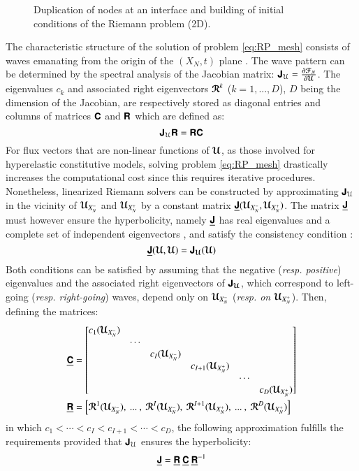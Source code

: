  
\begin{figure}[ht]
  \centering
  
  \caption{Duplication of nodes at an interface and building of initial conditions of the Riemann problem (2D).}
  \label{fig:2D_edge}
\end{figure}
The characteristic structure of the solution of problem \eqref{eq:RP_mesh} consists of waves emanating from the origin of the $(X_N,t)$ plane \cite{Courant}.
The wave pattern can be determined by the spectral analysis of the Jacobian matrix: $\boldsymbol{\mathsf{J}}_{\mathcal{U}} = \frac{\partial {\boldsymbol{\mathcal{F}}}_N}{\partial {\boldsymbol{\mathcal{U}}}}$.
The eigenvalues $c_k$ and associated right eigenvectors ${\boldsymbol{\mathcal{R}}}^k$ ($k=1, ..., D$), $D$ being the dimension of the Jacobian, are respectively stored as diagonal entries and columns of matrices $\boldsymbol{\mathsf{C}}$ and $\boldsymbol{\mathsf{R}}$ which are defined as:
\begin{equation}
  \label{eq:eigen_matrices}
  \boldsymbol{\mathsf{J}}_{\mathcal{U}} \boldsymbol{\mathsf{R}} = \boldsymbol{\mathsf{R}} \boldsymbol{\mathsf{C}}
\end{equation}
For flux vectors that are non-linear functions of ${\boldsymbol{\mathcal{U}}}$, as those involved for hyperelastic constitutive models, solving problem \eqref{eq:RP_mesh} drastically increases the computational cost since this requires iterative procedures.
Nonetheless, linearized Riemann solvers \cite{Toro} can be constructed by approximating $\boldsymbol{\mathsf{J}}_{\mathcal{U}}$ in the vicinity of ${\boldsymbol{\mathcal{U}}}_{X_N^-}$ and ${\boldsymbol{\mathcal{U}}}_{X_N^+}$ by a constant matrix $\underline{\boldsymbol{\mathsf{J}}}({\boldsymbol{\mathcal{U}}}_{X_N^-},{\boldsymbol{\mathcal{U}}}_{X_N^+})$.
The matrix $\underline{\boldsymbol{\mathsf{J}}}$ must however ensure the hyperbolicity, namely $\underline{\boldsymbol{\mathsf{J}}}$ has real eigenvalues and a complete set of independent eigenvectors \cite{Courant}, and satisfy the consistency condition \cite{Leveque}:
\begin{equation}
  \label{eq:consistency_Jacobian}
  \underline{\boldsymbol{\mathsf{J}}}({\boldsymbol{\mathcal{U}}},{\boldsymbol{\mathcal{U}}}) = \boldsymbol{\mathsf{J}}_{\boldsymbol{\mathcal{U}}}({\boldsymbol{\mathcal{U}}}) 
\end{equation}
Both conditions can be satisfied by assuming that the negative (\textit{resp. positive}) eigenvalues and the associated right eigenvectors of $\boldsymbol{\mathsf{J}}_{\boldsymbol{\mathcal{U}}}$, which correspond to left-going (\textit{resp. right-going}) waves, depend only on  ${\boldsymbol{\mathcal{U}}}_{X_N^-}$ (\textit{resp. on ${\boldsymbol{\mathcal{U}}}_{X_N^+}$}).
Then, defining the matrices:
\begin{align*}
  &\underline{\boldsymbol{\mathsf{C}}}=\left[\begin{matrix}c_1({\boldsymbol{\mathcal{U}}}_{X_N^-}) & & & & & \\ & \cdots & & && \\ & &c_I({\boldsymbol{\mathcal{U}}}_{X_N^-}) & & &\\ & & &c_{I+1}({\boldsymbol{\mathcal{U}}}_{X_N^+})& & \\ & & & &\cdots &\\ &&&&&c_D({\boldsymbol{\mathcal{U}}}_{X_N^+})\end{matrix}\right] \\
  &\underline{\boldsymbol{\mathsf{R}}} = \left[\begin{matrix}{\boldsymbol{\mathcal{R}}}^1({\boldsymbol{\mathcal{U}}}_{X_N^-}),\:  ...\:  ,\: {\boldsymbol{\mathcal{R}}}^I({\boldsymbol{\mathcal{U}}}_{X_N^-}),\: {\boldsymbol{\mathcal{R}}}^{I+1}({\boldsymbol{\mathcal{U}}}_{X_N^+}),\:...\: ,\: {\boldsymbol{\mathcal{R}}}^D({\boldsymbol{\mathcal{U}}}_{X_N^+})\end{matrix}\right] 
\end{align*}
in which $c_1<\cdots <c_I<c_{I+1}<\cdots < c_D$, the following approximation fulfills the requirements provided that $\boldsymbol{\mathsf{J}}_{\mathcal{U}}$ ensures the hyperbolicity:
\begin{equation}
  \label{eq:3}
  \underline{\boldsymbol{\mathsf{J}}} = \underline{\boldsymbol{\mathsf{R}}} \: \underline{\boldsymbol{\mathsf{C}}} \: \underline{\boldsymbol{\mathsf{R}}}^{-1}
\end{equation}

